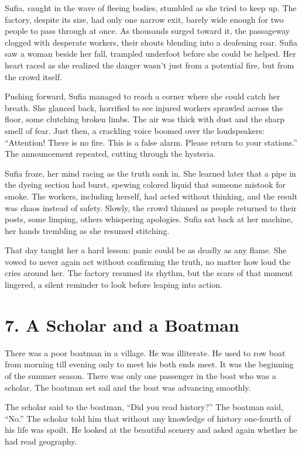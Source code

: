 \documentclass{article}
\begin{document}
Sufia, caught in the wave of fleeing bodies, stumbled as she tried to keep up. The factory, despite its size, had only one narrow exit, barely wide enough for two people to pass through at once. As thousands surged toward it, the passageway clogged with desperate workers, their shouts blending into a deafening roar. Sufia saw a woman beside her fall, trampled underfoot before she could be helped. Her heart raced as she realized the danger wasn’t just from a potential fire, but from the crowd itself.

Pushing forward, Sufia managed to reach a corner where she could catch her breath. She glanced back, horrified to see injured workers sprawled across the floor, some clutching broken limbs. The air was thick with dust and the sharp smell of fear. Just then, a crackling voice boomed over the loudspeakers: “Attention! There is no fire. This is a false alarm. Please return to your stations.” The announcement repeated, cutting through the hysteria.

Sufia froze, her mind racing as the truth sank in. She learned later that a pipe in the dyeing section had burst, spewing colored liquid that someone mistook for smoke. The workers, including herself, had acted without thinking, and the result was chaos instead of safety. Slowly, the crowd thinned as people returned to their posts, some limping, others whispering apologies. Sufia sat back at her machine, her hands trembling as she resumed stitching.

That day taught her a hard lesson: panic could be as deadly as any flame. She vowed to never again act without confirming the truth, no matter how loud the cries around her. The factory resumed its rhythm, but the scars of that moment lingered, a silent reminder to look before leaping into action.

\section*{7. A Scholar and a Boatman}
There was a poor boatman in a village. He was illiterate. He used to row boat from morning till evening only to meet his both ends meet. It was the beginning of the summer season. There was only one passenger in the boat who was a scholar. The boatman set sail and the boat was advancing smoothly.

The scholar said to the boatman, “Did you read history?” The boatman said, “No.” The scholar told him that without any knowledge of history one-fourth of his life was spoilt. He looked at the beautiful scenery and asked again whether he had read geography.
\end{document}
